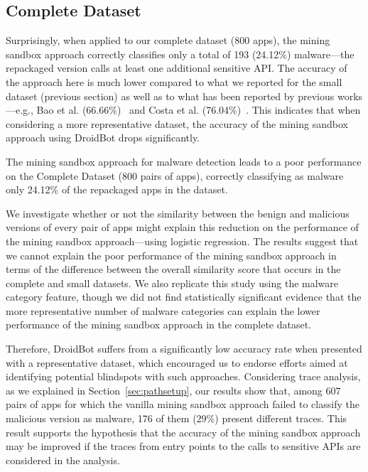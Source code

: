\subsection{Complete Dataset} 

Surprisingly, when applied to our complete dataset (\num{800} apps), the mining
sandbox approach correctly classifies only a total of \num{193} (\num{24.12}\%) malware---the
repackaged version calls at least one additional sensitive API.
The accuracy of the approach here is much lower compared to what we reported for the
small dataset (previous section) as well as to what has been reported by previous works---e.g.,
Bao et al. (\num{66.66}\%)~\cite{DBLP:conf/wcre/BaoLL18} and Costa et al.
(\num{76.04}\%)~\cite{DBLP:journals/jss/CostaMMSSBNR22}. 
This indicates that when considering a more representative dataset, the accuracy of the mining sandbox
approach using DroidBot drops significantly. 

\begin{obs}{4}{}
  The mining sandbox approach for malware detection
  leads to a poor performance on the Complete Dataset (\num{800} pairs of apps),
  correctly classifying as malware only \num{24.12}\% of the repackaged
  apps in the dataset.
\end{obs}

We investigate whether or not the similarity between
the benign and malicious versions of every pair of apps
might explain this reduction on the performance of
the mining sandbox approach---using logistic regression.
The results suggest that we cannot explain the
poor performance of the mining sandbox approach
in terms of the difference between the overall similarity score that occurs in the
complete and small datasets. We also replicate this study using the
malware category feature, though we did not find
statistically significant evidence that the more representative
number of malware categories can explain the lower
performance of the mining sandbox approach in the
complete dataset. 


Therefore, DroidBot suffers from a significantly low accuracy rate when presented with a representative dataset, 
which encouraged us to endorse efforts aimed at identifying potential blindspots with such approaches.
Considering trace analysis, as we explained in Section~\ref{sec:pathsetup},
our results show that, among $607$ pairs of apps for which the vanilla mining
sandbox approach failed to classify the malicious version as malware, \num{176} of them ($29$\%) present different traces.
This result supports the hypothesis that the accuracy of the mining sandbox approach may be improved if the traces
from entry points to the calls to sensitive APIs are considered in the analysis.

